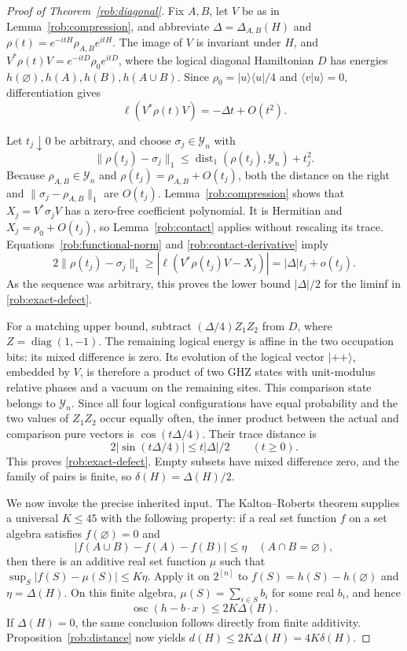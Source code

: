 \documentclass[reqno]{amsart}
\theoremstyle{definition}
\theoremstyle{remark}
\DeclareMathOperator{\diag}{diag}
\begin{document}
\begin{proof}[Proof of Theorem~\ref{rob:diagonal}]
Fix $A,B$, let $V$ be as in Lemma~\ref{rob:compression}, and abbreviate
$\Delta=\Delta_{A,B}(H)$ and
$\rho(t)=e^{-itH}\rho_{A,B}e^{itH}$.
The image of $V$ is invariant under $H$, and
$V^*\rho(t)V=e^{-itD}\rho_0e^{itD}$, where the logical diagonal
Hamiltonian $D$ has energies
$h(\varnothing),h(A),h(B),h(A\cup B)$.
Since $\rho_0=|u\rangle\langle u|/4$ and $\langle v|u\rangle=0$,
differentiation gives
\begin{equation}
 \ell(V^*\rho(t)V)=-\Delta t+O(t^2).
 \label{rob:contact-derivative}
\end{equation}

Let $t_j\downarrow0$ be arbitrary, and choose
$\sigma_j\in\mathcal Y_n$ with
\[
 \|\rho(t_j)-\sigma_j\|_1
 \leq\operatorname{dist}_1(\rho(t_j),\mathcal Y_n)+t_j^2.
\]
Because $\rho_{A,B}\in\mathcal Y_n$ and
$\rho(t_j)=\rho_{A,B}+O(t_j)$, both the distance on the right and
$\|\sigma_j-\rho_{A,B}\|_1$ are $O(t_j)$.
Lemma~\ref{rob:compression} shows that
$X_j=V^*\sigma_j V$ has a zero-free coefficient polynomial.
It is Hermitian and $X_j=\rho_0+O(t_j)$, so
Lemma~\ref{rob:contact} applies without rescaling its trace.
Equations~\eqref{rob:functional-norm} and
\eqref{rob:contact-derivative} imply
\[
 2\|\rho(t_j)-\sigma_j\|_1
 \geq |\ell(V^*\rho(t_j)V-X_j)|
 =|\Delta|t_j+o(t_j).
\]
As the sequence was arbitrary, this proves the lower bound
$|\Delta|/2$ for the liminf in \eqref{rob:exact-defect}.

For a matching upper bound, subtract $(\Delta/4)Z_1Z_2$ from $D$,
where $Z=\diag(1,-1)$.  The remaining logical energy is affine in the
two occupation bits: its mixed difference is zero.  Its evolution of
the logical vector $|++\rangle$, embedded by $V$, is therefore a
product of two GHZ states with unit-modulus relative phases and a
vacuum on the remaining sites.  This comparison state belongs to
$\mathcal Y_n$.  Since all four logical configurations have equal
probability and the two values of $Z_1Z_2$ occur equally often, the
inner product between the actual and comparison pure vectors is
$\cos(t\Delta/4)$.  Their trace distance is
\[
 2|\sin(t\Delta/4)|\leq t|\Delta|/2\qquad(t\geq0).
\]
This proves \eqref{rob:exact-defect}.  Empty subsets have mixed
difference zero, and the family of pairs is finite, so
$\delta(H)=\Delta(H)/2$.

We now invoke the precise inherited input.  The Kalton--Roberts
theorem \cite[Theorem~4.1]{KaltonRoberts83} supplies a universal
$K\leq45$ with the following property: if a real set function $f$ on
a set algebra satisfies $f(\varnothing)=0$ and
\[
 |f(A\cup B)-f(A)-f(B)|\leq\eta
 \quad(A\cap B=\varnothing),
\]
then there is an additive real set function $\mu$ such that
$\sup_S|f(S)-\mu(S)|\leq K\eta$.
Apply it on $2^{[n]}$ to $f(S)=h(S)-h(\varnothing)$ and
$\eta=\Delta(H)$.  On this finite algebra,
$\mu(S)=\sum_{i\in S}b_i$ for some real $b_i$, and hence
\[
 \operatorname{osc}(h-b\cdot x)\leq2K\Delta(H).
\]
If $\Delta(H)=0$, the same conclusion follows directly from finite
additivity.  Proposition~\ref{rob:distance} now yields
$d(H)\leq2K\Delta(H)=4K\delta(H)$.


\end{proof}
\end{document}
